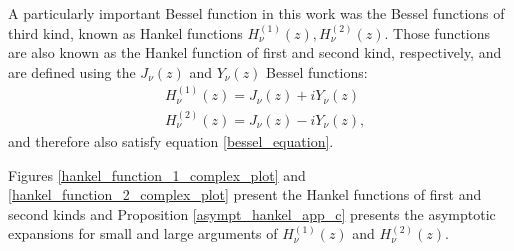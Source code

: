 A particularly important Bessel function in this work was the Bessel functions of third kind, known as Hankel functions \(H_\nu^{(1)}(z), H_\nu^{(2)}(z)\). Those functions are also known as the Hankel function of first and second kind, respectively, and are defined using the \(J_\nu(z)\) and \(Y_\nu(z)\) Bessel functions:
\begin{align*}
    &H_\nu^{(1)}(z) = J_\nu(z) + i Y_\nu(z)\\
    &H_\nu^{(2)}(z) = J_\nu(z) - i Y_\nu(z),
\end{align*}
and therefore also satisfy equation \eqref{bessel_equation}.

Figures \ref{hankel_function_1_complex_plot} and \ref{hankel_function_2_complex_plot} present the Hankel functions of first and second kinds and Proposition \ref{asympt_hankel_app_c} presents the asymptotic expansions for small and large arguments of \(H_\nu^{(1)}(z)\) and \(H_\nu^{(2)}(z)\).

